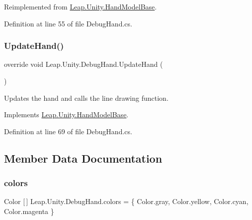 Reimplemented from \mbox{\hyperlink{class_leap_1_1_unity_1_1_hand_model_base_acd4789523584dd7d240e1d426b4d321c}{Leap.\+Unity.\+Hand\+Model\+Base}}.



Definition at line 55 of file Debug\+Hand.\+cs.

\mbox{\label{class_leap_1_1_unity_1_1_debug_hand_a72947d57d9e6eaabade4aa289d5052bd}} 
\subsubsection{\texorpdfstring{UpdateHand()}{UpdateHand()}}
{\footnotesize\ttfamily override void Leap.\+Unity.\+Debug\+Hand.\+Update\+Hand (\begin{DoxyParamCaption}{ }\end{DoxyParamCaption})\hspace{0.3cm}{\ttfamily [virtual]}}

Updates the hand and calls the line drawing function. 

Implements \mbox{\hyperlink{class_leap_1_1_unity_1_1_hand_model_base_ae80b6c96322d078f01aacc02639d9dd0}{Leap.\+Unity.\+Hand\+Model\+Base}}.



Definition at line 69 of file Debug\+Hand.\+cs.



\subsection{Member Data Documentation}
\mbox{\label{class_leap_1_1_unity_1_1_debug_hand_abe57d750cd5877dc24cc93f593fb0d3b}} 
\subsubsection{\texorpdfstring{colors}{colors}}
{\footnotesize\ttfamily Color \mbox{[}$\,$\mbox{]} Leap.\+Unity.\+Debug\+Hand.\+colors = \{ Color.\+gray, Color.\+yellow, Color.\+cyan, Color.\+magenta \}\hspace{0.3cm}{\ttfamily [protected]}}

